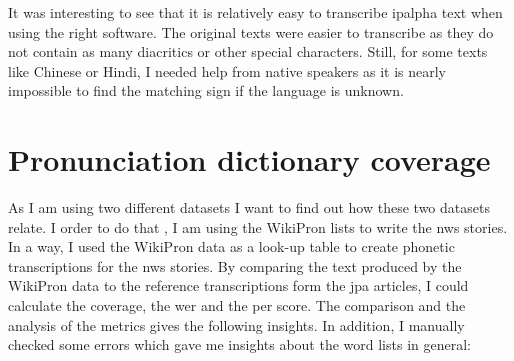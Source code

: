 It was interesting to see that it is relatively easy to transcribe \ac{ipalpha} text when using the right software. The original texts were easier to transcribe as they do not contain as many diacritics or other special characters. Still, for some texts like Chinese or Hindi, I needed help from native speakers as it is nearly impossible to find the matching sign if the language is unknown. 

\section{Pronunciation dictionary coverage}
As I am using two different datasets I want to find out how these two datasets relate. I order to do that , I am using the WikiPron lists to write the \ac{nws} stories. In a way, I used the WikiPron data as a look-up table to create phonetic transcriptions for the \ac{nws} stories. By comparing the text produced by the WikiPron data to the reference transcriptions form the \ac{jpa} articles, I  could calculate the coverage, the \ac{wer} and the \ac{per} score. The comparison and the analysis of the metrics gives the following insights. In addition, I manually checked some errors which gave me insights about the word lists in general:

